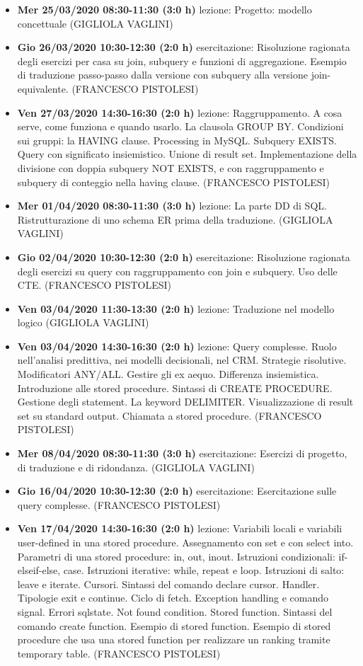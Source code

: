 \begin{itemize}
	\item \textbf{Mer 25/03/2020 08:30-11:30 (3:0 h)} lezione: Progetto: modello concettuale (GIGLIOLA VAGLINI)
	\item \textbf{Gio 26/03/2020 10:30-12:30 (2:0 h)} esercitazione: Risoluzione ragionata degli esercizi per casa su join, subquery e funzioni di aggregazione. Esempio di traduzione passo-passo dalla versione con subquery alla versione join-equivalente. (FRANCESCO PISTOLESI)
	\item \textbf{Ven 27/03/2020 14:30-16:30 (2:0 h)} lezione: Raggruppamento. A cosa serve, come funziona e quando usarlo. La clausola GROUP BY. Condizioni sui gruppi: la HAVING clause. Processing in MySQL. Subquery EXISTS. Query con significato insiemistico. Unione di result set. Implementazione della divisione con doppia subquery NOT EXISTS, e con raggruppamento e subquery di conteggio nella having clause. (FRANCESCO PISTOLESI)
	\item \textbf{Mer 01/04/2020 08:30-11:30 (3:0 h)} lezione: La parte DD di SQL. Ristrutturazione di uno schema ER prima della traduzione. (GIGLIOLA VAGLINI)
	\item \textbf{Gio 02/04/2020 10:30-12:30 (2:0 h)} esercitazione: Risoluzione ragionata degli esercizi su query con raggruppamento con join e subquery. Uso delle CTE. (FRANCESCO PISTOLESI)
	\item \textbf{Ven 03/04/2020 11:30-13:30 (2:0 h)} lezione: Traduzione nel modello logico (GIGLIOLA VAGLINI)
	\item \textbf{Ven 03/04/2020 14:30-16:30 (2:0 h)} lezione: Query complesse. Ruolo nell'analisi predittiva, nei modelli decisionali, nel CRM. Strategie risolutive. Modificatori ANY/ALL. Gestire gli ex aequo. Differenza insiemistica. Introduzione alle stored procedure. Sintassi di CREATE PROCEDURE. Gestione degli statement. La keyword DELIMITER. Visualizzazione di result set su standard output. Chiamata a stored procedure. (FRANCESCO PISTOLESI)
	\item \textbf{Mer 08/04/2020 08:30-11:30 (3:0 h)} esercitazione: Esercizi di progetto, di traduzione e di ridondanza. (GIGLIOLA VAGLINI)
	\item \textbf{Gio 16/04/2020 10:30-12:30 (2:0 h)} esercitazione: Esercitazione sulle query complesse. (FRANCESCO PISTOLESI)
	\item \textbf{Ven 17/04/2020 14:30-16:30 (2:0 h)} lezione: Variabili locali e variabili user-defined in una stored procedure. Assegnamento con set e con select into. Parametri di una stored procedure: in, out, inout. Istruzioni condizionali: if-elseif-else, case. Istruzioni iterative: while, repeat e loop. Istruzioni di salto: leave e iterate. Cursori. Sintassi del comando declare cursor. Handler. Tipologie exit e continue. Ciclo di fetch. Exception handling e comando signal. Errori sqlstate. Not found condition. Stored function. Sintassi del comando create function. Esempio di stored function. Esempio di stored procedure che usa una stored function per realizzare un ranking tramite temporary table. (FRANCESCO PISTOLESI)

\end{itemize}
